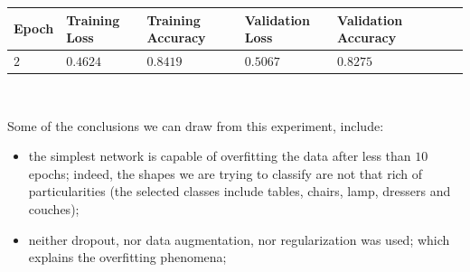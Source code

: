 \documentclass[11pt,a4paper]{article}
\begin{document}
\begin{center}
\begin{tabular}{|p{1.2cm}|p{1.8cm}|p{2cm}|p{2cm}|p{2cm}|p{2cm}|p{2cm}|}
\rowcolor{gray!50}
\hline
\textbf{Epoch} & \textbf{Training Loss} & \textbf{Training Accuracy} & \textbf{Validation Loss} & \textbf{Validation Accuracy}\\
\hline
$2$ & $0.4624$ & $0.8419$ & $0.5067$ & $0.8275$\\
\hline
\end{tabular}\\
\end{center}
Some of the conclusions we can draw from this experiment, include:
\begin{itemize}
    \item the simplest network is capable of overfitting the data after less than $10$ epochs; indeed, the shapes we are trying to classify are not that rich of particularities (the selected classes include tables, chairs, lamp, dressers and couches);
    \item neither dropout, nor data augmentation, nor regularization was used; which explains the overfitting phenomena;
\end{itemize}
\end{document}
